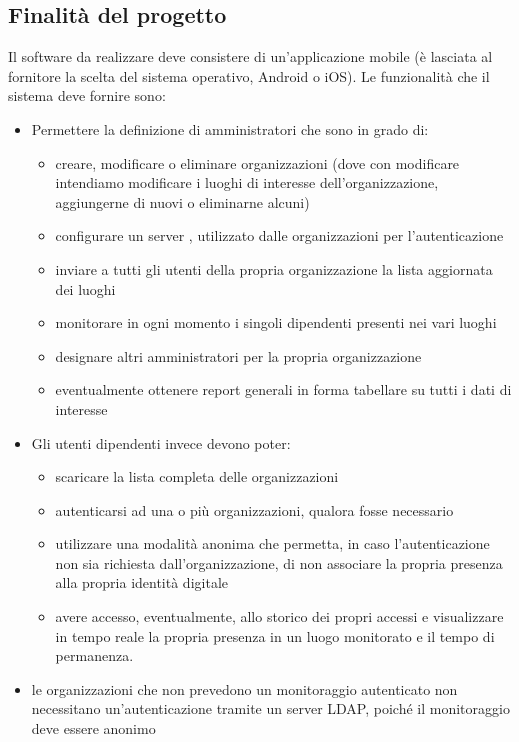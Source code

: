 \documentclass[../studio-di-fattibilita.tex]{subfiles}
\begin{document}
  \subsection{Finalità del progetto}%
  \label{subsec:finalita_del_progetto}
  Il software da realizzare deve consistere di un'applicazione mobile (è lasciata al fornitore la scelta del sistema operativo, Android o iOS). Le funzionalità che il sistema deve fornire sono:
  \begin{itemize}
    \item Permettere la definizione di amministratori che sono in grado di:
    \begin{itemize}
        \item creare, modificare o eliminare organizzazioni (dove con modificare intendiamo modificare i luoghi di interesse dell'organizzazione, aggiungerne di nuovi o eliminarne alcuni)
        \item configurare un server , utilizzato dalle organizzazioni per l'autenticazione
        \item inviare a tutti gli utenti della propria organizzazione la lista aggiornata dei luoghi
        \item monitorare in ogni momento i singoli dipendenti presenti nei vari luoghi
        \item designare altri amministratori per la propria organizzazione
        \item eventualmente ottenere report generali in forma tabellare su tutti i dati di interesse
    \end{itemize}
    \item Gli utenti dipendenti invece devono poter:
    \begin{itemize}
        \item scaricare la lista completa delle organizzazioni
        \item autenticarsi ad una o più organizzazioni, qualora fosse necessario
        \item utilizzare una modalità anonima che permetta, in caso l'autenticazione non sia richiesta dall'organizzazione, di non associare la propria presenza alla propria identità digitale
        \item avere accesso, eventualmente, allo storico dei propri accessi e visualizzare in tempo reale la propria presenza in un luogo monitorato e il tempo di permanenza.
    \end{itemize}
    \item le organizzazioni che non prevedono un monitoraggio autenticato non necessitano un'autenticazione tramite un server LDAP, poiché il monitoraggio deve essere anonimo

\end{itemize}
\end{document}
